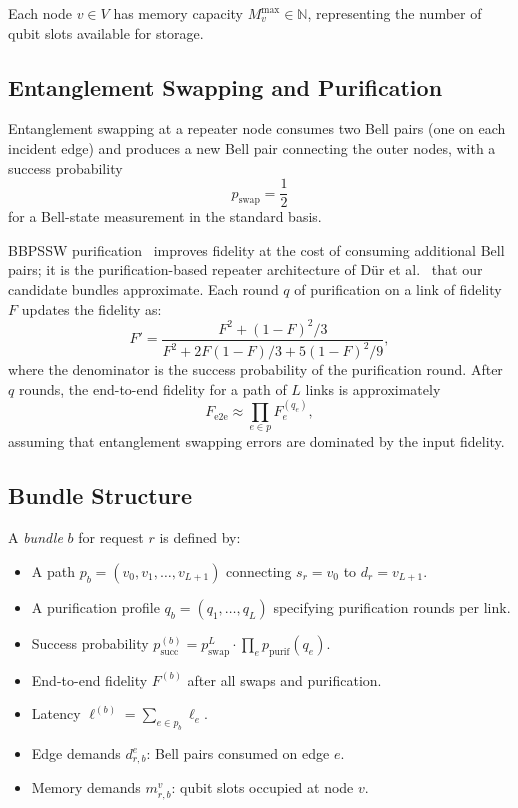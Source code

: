 \documentclass[10pt,a4paper]{article}
\newcommand{\N}{\mathbb{N}}
\begin{document}
Each node $v \in V$ has memory capacity $M_v^{\max} \in \N$,
representing the number of qubit slots available for storage.

\subsection{Entanglement Swapping and Purification}

Entanglement swapping at a repeater node consumes two Bell pairs
(one on each incident edge) and produces a new Bell pair connecting
the outer nodes, with a success probability
\begin{equation}
  p_{\text{swap}} = \frac{1}{2}
\end{equation}
for a Bell-state measurement in the standard basis.

BBPSSW purification~\cite{bennett1996purification} improves fidelity
at the cost of consuming additional Bell pairs; it is the
purification-based repeater architecture of
D\"ur et al.~\cite{dur1999entanglement,briegel1998quantum} that our
candidate bundles approximate.  Each round $q$ of purification on a
link of fidelity $F$ updates the fidelity as:
\begin{equation}
  F' = \frac{F^2 + (1-F)^2/3}{F^2 + 2F(1-F)/3 + 5(1-F)^2/9},
\end{equation}
where the denominator is the success probability of the purification
round.  After $q$ rounds, the end-to-end fidelity for a path of
$L$ links is approximately
\begin{equation}
  F_{\text{e2e}} \approx \prod_{e \in p} F_e^{(q_e)},
\end{equation}
assuming that entanglement swapping errors are dominated by the input
fidelity.

\subsection{Bundle Structure}

A \emph{bundle} $b$ for request $r$ is defined by:
\begin{itemize}
  \item A path $p_b = (v_0, v_1, \dots, v_{L+1})$ connecting
    $s_r = v_0$ to $d_r = v_{L+1}$.
  \item A purification profile $q_b = (q_1, \dots, q_L)$ specifying
    purification rounds per link.
  \item Success probability
    $p_{\text{succ}}^{(b)} = p_{\text{swap}}^{L} \cdot \prod_{e}
    p_{\text{purif}}(q_e)$.
  \item End-to-end fidelity $F^{(b)}$ after all swaps and
    purification.
  \item Latency $\ell^{(b)} = \sum_{e \in p_b} \ell_e$.
  \item Edge demands $d_{r,b}^e$: Bell pairs consumed on edge $e$.
  \item Memory demands $m_{r,b}^v$: qubit slots occupied at node $v$.
\end{itemize}
\end{document}
